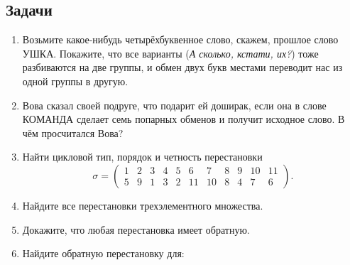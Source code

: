 \subsection*{Задачи}
\begin{enumerate}
    \item Возьмите какое-нибудь четырёхбуквенное слово, скажем, прошлое слово \textsf{УШКА}.
        Покажите, что все варианты (\emph{А сколько, кстати, их?}) тоже разбиваются на две группы,
        и обмен двух букв местами переводит нас из одной группы в другую.
    \item Вова сказал своей подруге, что подарит ей доширак,
        если она в слове \textsf{КОМАНДА} сделает семь попарных обменов и получит исходное слово.
        В чём просчитался Вова?
    \item Найти цикловой тип, порядок и четность перестановки
        \[
            \sigma = \begin{pmatrix}
                1 & 2 & 3 & 4 & 5 & 6 & 7 & 8 & 9 & 10 & 11 \\
                5 & 9 & 1 & 3 & 2 & 11 & 10 & 8 & 4 & 7 & 6
            \end{pmatrix}.
        \]
    \item Найдите все перестановки трехэлементного множества.
    \item Докажите, что любая перестановка имеет обратную.
    \item Найдите обратную перестановку для: 


\end{enumerate}

